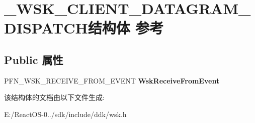 \hypertarget{struct___w_s_k___c_l_i_e_n_t___d_a_t_a_g_r_a_m___d_i_s_p_a_t_c_h}{}\section{\+\_\+\+W\+S\+K\+\_\+\+C\+L\+I\+E\+N\+T\+\_\+\+D\+A\+T\+A\+G\+R\+A\+M\+\_\+\+D\+I\+S\+P\+A\+T\+C\+H结构体 参考}
\label{struct___w_s_k___c_l_i_e_n_t___d_a_t_a_g_r_a_m___d_i_s_p_a_t_c_h}
\subsection*{Public 属性}
\begin{DoxyCompactItemize}
\item 
\mbox{\label{struct___w_s_k___c_l_i_e_n_t___d_a_t_a_g_r_a_m___d_i_s_p_a_t_c_h_aa88851c037b06f3af6d92a733d35b640}} 
P\+F\+N\+\_\+\+W\+S\+K\+\_\+\+R\+E\+C\+E\+I\+V\+E\+\_\+\+F\+R\+O\+M\+\_\+\+E\+V\+E\+NT {\bfseries Wsk\+Receive\+From\+Event}
\end{DoxyCompactItemize}


该结构体的文档由以下文件生成\+:\begin{DoxyCompactItemize}
\item 
E\+:/\+React\+O\+S-\/0../sdk/include/ddk/wsk.\+h\end{DoxyCompactItemize}

